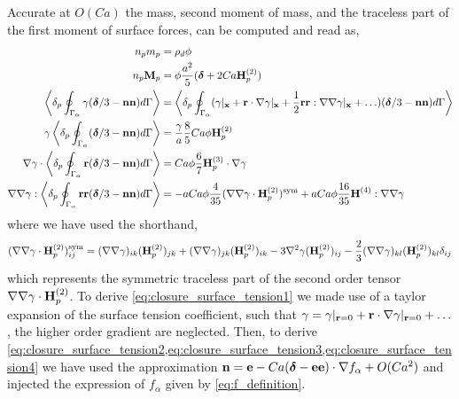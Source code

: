  
Accurate at $O(Ca)$ the mass, second moment of mass, and the traceless part of the first moment of surface forces, can be computed and read as,
\begin{align}
    n_p m_p &= \rho_d \phi   
    \label{eq:volume}
    \\ 
    \label{eq:second_moment_of_mass}
    n_p \textbf{M}_p &= \phi \frac{a^2}{5}(\bm\delta+2Ca \textbf{H}_p^{(2)}) \\
    \label{eq:closure_surface_tension1}
    \pSavg{\gamma (\bm\delta/3 - \textbf{nn})} &=
      \pSavg{(\gamma|_\textbf{x}+\textbf{r}\cdot \grad \gamma|_\textbf{x}+\frac{1}{2}\textbf{rr}:\grad\grad\gamma|_\textbf{x}+\ldots) (\bm\delta/3 - \textbf{nn})} \\
    \label{eq:closure_surface_tension2}
    \gamma \pSavg{ (\bm\delta/3 - \textbf{nn})}  
    &=
    \frac{\gamma}{a}\frac{8}{5} Ca \phi \textbf{H}_p^{(2)}\\
    \grad\gamma \cdot \pSavg{\textbf{r} (\bm\delta/3 - \textbf{nn})}  
    &= Ca  \phi  \frac{6}{7}  \textbf{H}^{(3)}_p\cdot \grad\gamma
    \label{eq:closure_surface_tension3}\\
    \grad\grad\gamma : \pSavg{\textbf{rr} (\bm\delta/3 - \textbf{nn})}  
    &= -a Ca \phi \frac{4}{35} 
        (\grad\grad \gamma \cdot \textbf{H}_p^{(2)})^\text{sym}
    +
    a Ca \phi \frac{16}{35} \textbf{H}^{(4)} :\grad\grad \gamma
    \label{eq:closure_surface_tension4}
\end{align}
where we have used the shorthand,
\begin{equation}
    (\mathbf{\nabla}\mathbf{\nabla} \gamma \cdot \textbf{H}_p^{(2)})^\text{sym}_{ij}
    =
    (\mathbf{\nabla}\mathbf{\nabla} \gamma)_{ik} (\textbf{H}_p^{(2)})_{jk}
    + (\mathbf{\nabla}\mathbf{\nabla} \gamma)_{jk} (\textbf{H}_p^{(2)})_{ik}
    - 3 \mathbf{\nabla}^2 \gamma (\textbf{H}_p^{(2)})_{ij}
    -\frac{2}{3}(\mathbf{\nabla}\mathbf{\nabla} \gamma)_{kl} (\textbf{H}_p^{(2)})_{kl}\delta_{ij}
\end{equation}
which represents the symmetric traceless part of the second order tensor $\mathbf{\nabla}\mathbf{\nabla} \gamma \cdot \textbf{H}_p^{(2)}$. 
To derive \ref{eq:closure_surface_tension1} we made use of a taylor expansion of the surface tension coefficient, such that $\gamma = \gamma|_{\textbf{r}=0}+ \textbf{r}\cdot \mathbf{\nabla}\gamma|_{\textbf{r}=0}+ \ldots$, the higher order gradient are neglected. 
Then, to derive \ref{eq:closure_surface_tension2,eq:closure_surface_tension3,eq:closure_surface_tension4} we have used the approximation $\textbf{n} = \textbf{e} - Ca (\bm\delta - \textbf{e}\textbf{e})\cdot \mathbf{\nabla} f_\alpha + O(Ca^2)$ and injected the expression of $f_\alpha$ given by \ref{eq:f_definition}.  


